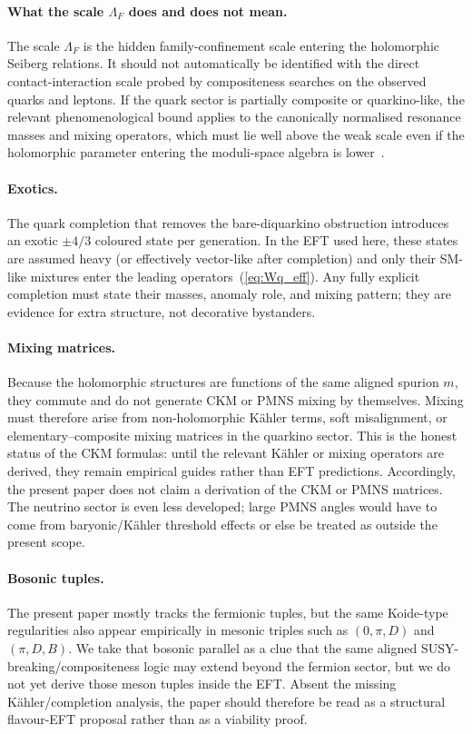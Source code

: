 \documentclass[11pt,a4paper]{article}
\begin{document}
\paragraph{What the scale $\Lambda_F$ does and does not mean.}
The scale $\Lambda_F$ is the hidden family-confinement scale entering the
holomorphic Seiberg relations.  It should not automatically be identified with
the direct contact-interaction scale probed by compositeness searches on the
observed quarks and leptons.  If the quark sector is partially composite or
quarkino-like, the relevant phenomenological bound applies to the canonically
normalised resonance masses and mixing operators, which must lie well above the
weak scale even if the holomorphic parameter entering the moduli-space algebra
is lower~\cite{Kaplan:1991dc,Strassler:1995,NelsonStrassler:2000}.

\paragraph{Exotics.}
The quark completion that removes the bare-diquarkino obstruction introduces an
exotic $\pm4/3$ coloured state per generation.  In the EFT used here, these
states are assumed heavy (or effectively vector-like after completion) and only
their SM-like mixtures enter the leading operators~(\ref{eq:Wq_eff}).  Any
fully explicit completion must state their masses, anomaly role, and mixing
pattern; they are evidence for extra structure, not decorative bystanders.

\paragraph{Mixing matrices.}
Because the holomorphic structures are functions of the same aligned spurion
$m$, they commute and do not generate CKM or PMNS mixing by themselves.
Mixing must therefore arise from non-holomorphic K\"ahler terms, soft
misalignment, or elementary--composite mixing matrices in the quarkino sector.
This is the honest status of the CKM formulas: until the relevant K\"ahler or
mixing operators are derived, they remain empirical guides rather than EFT
predictions.  Accordingly, the present paper does not claim a derivation of the
CKM or PMNS matrices.  The neutrino sector is even less developed; large PMNS
angles would have to come from baryonic/K\"ahler threshold effects or else be
treated as outside the present scope.

\paragraph{Bosonic tuples.}
The present paper mostly tracks the fermionic tuples, but the same Koide-type
regularities also appear empirically in mesonic triples such as
$(0,\pi,D)$ and $(\pi,D,B)$.  We take that bosonic parallel as a clue that the
same aligned SUSY-breaking/compositeness logic may extend beyond the fermion
sector, but we do not yet derive those meson tuples inside the EFT.
Absent the missing K\"ahler/completion analysis, the paper should therefore be
read as a structural flavour-EFT proposal rather than as a viability proof.
\end{document}
